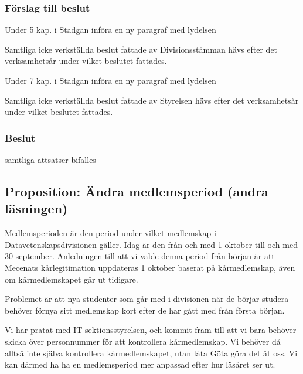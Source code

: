\documentclass[protokoll]{dvd}
\begin{document}
\subsubsection*{Förslag till beslut}

\begin{attsatser}
	\item Under 5 kap. i Stadgan införa en ny paragraf med lydelsen

	\begin{displayquote}
		Samtliga icke verkställda beslut fattade av Divisionsstämman hävs efter det verksamhetsår under vilket beslutet fattades.
	\end{displayquote}

	\item Under 7 kap. i Stadgan införa en ny paragraf med lydelsen

	\begin{displayquote}
		Samtliga icke verkställda beslut fattade av Styrelsen hävs efter det verksamhetsår under vilket beslutet fattades.
	\end{displayquote}
\end{attsatser}

\subsubsection*{Beslut}
    \begin{attsatser}
        \item samtliga attsatser bifalles
    \end{attsatser}

\newpage
\subsection{Proposition: Ändra medlemsperiod (andra läsningen)}

Medlemsperioden är den period under vilket medlemskap i Datavetenskapsdivisionen gäller.
Idag är den från och med 1 oktober till och med 30 september.
Anledningen till att vi valde denna period från början är att Mecenats kårlegitimation uppdateras 1 oktober baserat på kårmedlemskap, även om kårmedlemskapet går ut tidigare.

Problemet är att nya studenter som går med i divisionen när de börjar studera behöver förnya sitt medlemskap kort efter de har gått med från första början.

Vi har pratat med IT-sektionsstyrelsen, och kommit fram till att vi bara behöver skicka över personnummer för att kontrollera kårmedlemskap.
Vi behöver då alltså inte själva kontrollera kårmedlemskapet, utan låta Göta göra det åt oss.
Vi kan därmed ha ha en medlemsperiod mer anpassad efter hur läsåret ser ut.
\end{document}
